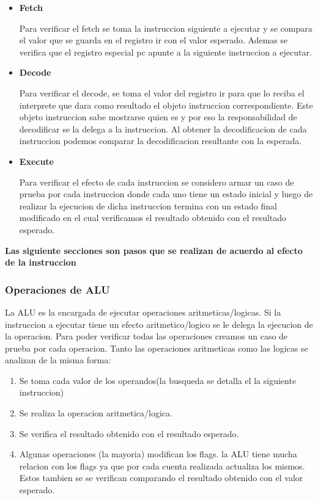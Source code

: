 \begin{itemize}
\item \textbf{Fetch} 

Para verificar el fetch se toma la instruccion siguiente a ejecutar y se compara el valor que se guarda en el registro ir con el valor esperado. Ademas se verifica que el registro especial pc apunte a la siguiente instruccion a ejecutar.

\item \textbf{Decode}

Para verificar el decode, se toma el valor del registro ir para que lo reciba el interprete que dara como resultado el objeto instruccion correspondiente. Este objeto instruccion sabe mostrarse quien es y por eso la responsabilidad de decodificar se la delega a la instruccion. Al obtener la decodificacion de cada instruccion podemos comparar la decodificacion resultante con la esperada.
 
\item \textbf{Execute}

Para verificar el efecto de cada instruccion se considero armar un caso de prueba por cada instruccion donde cada uno tiene un estado inicial y luego de realizar la ejecucion de dicha instruccion termina con un estado final modificado en el cual verificamos el resultado obtenido con el resultado esperado. 
\end{itemize}

\textbf{Las siguiente secciones son pasos que se realizan de acuerdo al efecto de la instruccion}
  
\subsubsection{Operaciones de ALU}

La ALU es la encargada de ejecutar operaciones aritmeticas/logicas. Si la instruccion a ejecutar tiene un efecto aritmetico/logico se le delega la ejecucion de la operacion. Para poder verificar todas las operaciones creamos un caso de prueba por cada operacion. Tanto las operaciones aritmeticas como las logicas se analizan de la misma forma:

\begin{enumerate}
\item Se toma cada valor de los operandos(la busqueda se detalla el la siguiente instruccion)

\item Se realiza la operacion aritmetica/logica. 

\item Se verifica el resultado obtenido con el resultado esperado.

\item Algunas operaciones (la mayoria) modifican los flags. la ALU tiene mucha relacion con los flags ya que por cada cuenta realizada actualiza los mismos. Estos tambien se se verifican comparando el resultado obtenido con el valor esperado. 
\end{enumerate}

